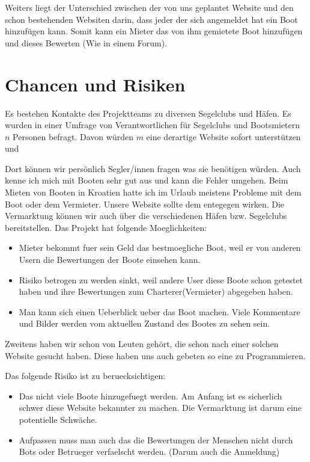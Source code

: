 \documentclass[12pt]{article}
\theoremstyle{definition}
\begin{document}
Weiters liegt der Unterschied zwischen der von uns geplantet Website und den schon bestehenden Websiten darin, dass jeder der sich angemeldet hat ein Boot hinzufügen kann. Somit kann ein Mieter das von ihm gemietete Boot hinzufügen und dieses Bewerten (Wie in einem Forum).

\pagebreak

\section{Chancen und Risiken}
Es bestehen Kontakte des Projektteams zu diversen Segelclubs und Häfen. Es wurden in einer Umfrage von Verantwortlichen für Segelclubs und Bootsmietern $n$ Personen befragt. Davon würden $m$ eine derartige Website sofort unterstützen und 

Dort können wir persönlich Segler/innen fragen was sie benötigen würden. Auch kenne ich mich mit Booten sehr gut aus und kann die Fehler umgehen. Beim Mieten von Booten in Kroatien hatte ich im Urlaub meistens Probleme mit dem Boot oder dem Vermieter. Unsere Website sollte dem entegegen wirken. 
Die Vermarktung können wir auch über die verschiedenen Häfen bzw. Segelclubs bereitstellen. 
Das Projekt hat folgende Moeglichkeiten:
\begin{itemize}
\item Mieter bekommt fuer sein Geld das bestmoegliche Boot, weil er von anderen Usern die Bewertungen der Boote einsehen kann.
\item Risiko betrogen zu werden sinkt, weil andere User diese Boote schon getestet haben und ihre Bewertungen zum Charterer(Vermieter) abgegeben haben.
\item Man kann sich einen Ueberblick ueber das Boot machen. Viele Kommentare und Bilder werden vom aktuellen Zustand des Bootes zu sehen sein.
\end{itemize}

Zweitens haben wir schon von Leuten gehört, die schon nach einer solchen Website gesucht haben. Diese haben uns auch gebeten so eine zu Programmieren.

Das folgende Risiko ist zu beruecksichtigen:
\begin{itemize}
\item Das nicht viele Boote hinzugefuegt werden. Am Anfang ist es sicherlich schwer diese Website bekannter zu machen. Die Vermarktung ist darum eine potentielle Schwäche.
\item Aufpassen muss man auch das die Bewertungen der Menschen nicht durch Bots oder Betrueger verfaelscht werden. (Darum auch die Anmeldung)
\end{itemize}
\end{document}

